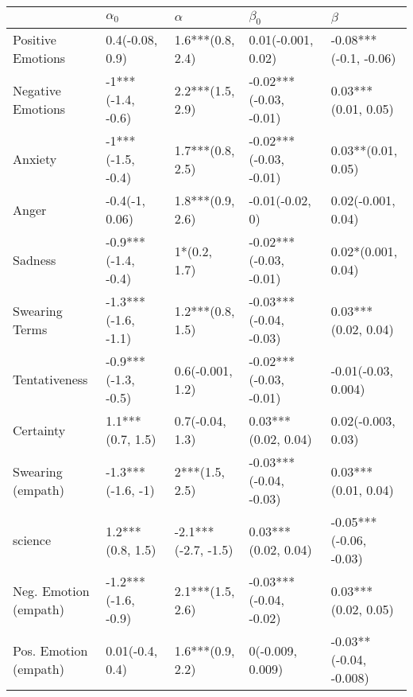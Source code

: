 \begin{tabular}{lllll}
\toprule
{} &           $\alpha_0$ &             $\alpha$ &               $\beta_0$ &                 $\beta$ \\
\midrule
Positive Emotions     &      0.4(-0.08, 0.9) &     1.6***(0.8, 2.4) &      0.01(-0.001, 0.02) &   -0.08***(-0.1, -0.06) \\
Negative Emotions     &    -1***(-1.4, -0.6) &     2.2***(1.5, 2.9) &  -0.02***(-0.03, -0.01) &     0.03***(0.01, 0.05) \\
Anxiety               &    -1***(-1.5, -0.4) &     1.7***(0.8, 2.5) &  -0.02***(-0.03, -0.01) &      0.03**(0.01, 0.05) \\
Anger                 &       -0.4(-1, 0.06) &     1.8***(0.9, 2.6) &         -0.01(-0.02, 0) &      0.02(-0.001, 0.04) \\
Sadness               &  -0.9***(-1.4, -0.4) &         1*(0.2, 1.7) &  -0.02***(-0.03, -0.01) &      0.02*(0.001, 0.04) \\
Swearing Terms        &  -1.3***(-1.6, -1.1) &     1.2***(0.8, 1.5) &  -0.03***(-0.04, -0.03) &     0.03***(0.02, 0.04) \\
Tentativeness         &  -0.9***(-1.3, -0.5) &     0.6(-0.001, 1.2) &  -0.02***(-0.03, -0.01) &     -0.01(-0.03, 0.004) \\
Certainty             &     1.1***(0.7, 1.5) &      0.7(-0.04, 1.3) &     0.03***(0.02, 0.04) &      0.02(-0.003, 0.03) \\
Swearing (empath)     &    -1.3***(-1.6, -1) &       2***(1.5, 2.5) &  -0.03***(-0.04, -0.03) &     0.03***(0.01, 0.04) \\
science               &     1.2***(0.8, 1.5) &  -2.1***(-2.7, -1.5) &     0.03***(0.02, 0.04) &  -0.05***(-0.06, -0.03) \\
Neg. Emotion (empath) &  -1.2***(-1.6, -0.9) &     2.1***(1.5, 2.6) &  -0.03***(-0.04, -0.02) &     0.03***(0.02, 0.05) \\
Pos. Emotion (empath) &      0.01(-0.4, 0.4) &     1.6***(0.9, 2.2) &        0(-0.009, 0.009) &  -0.03**(-0.04, -0.008) \\
\bottomrule
\end{tabular}
